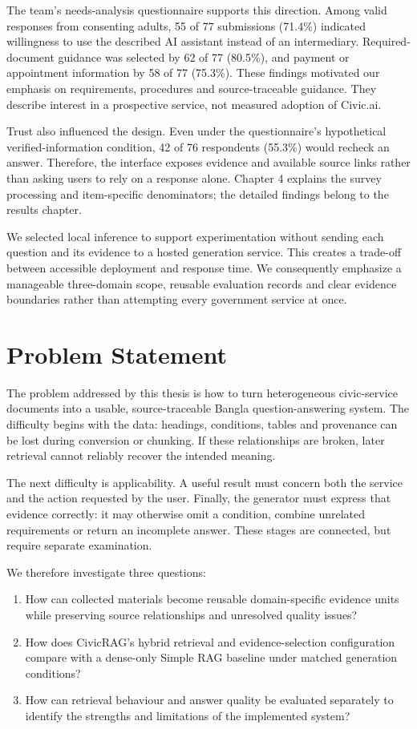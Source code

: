 The team's needs-analysis questionnaire supports this direction. Among valid responses from consenting adults, 55 of 77 submissions (71.4\%) indicated willingness to use the described AI assistant instead of an intermediary. Required-document guidance was selected by 62 of 77 (80.5\%), and payment or appointment information by 58 of 77 (75.3\%). These findings motivated our emphasis on requirements, procedures and source-traceable guidance. They describe interest in a prospective service, not measured adoption of Civic.ai.

Trust also influenced the design. Even under the questionnaire's hypothetical verified-information condition, 42 of 76 respondents (55.3\%) would recheck an answer. Therefore, the interface exposes evidence and available source links rather than asking users to rely on a response alone. Chapter 4 explains the survey processing and item-specific denominators; the detailed findings belong to the results chapter.

We selected local inference to support experimentation without sending each question and its evidence to a hosted generation service. This creates a trade-off between accessible deployment and response time. We consequently emphasize a manageable three-domain scope, reusable evaluation records and clear evidence boundaries rather than attempting every government service at once.

\section{Problem Statement}
The problem addressed by this thesis is how to turn heterogeneous civic-service documents into a usable, source-traceable Bangla question-answering system. The difficulty begins with the data: headings, conditions, tables and provenance can be lost during conversion or chunking. If these relationships are broken, later retrieval cannot reliably recover the intended meaning.

The next difficulty is applicability. A useful result must concern both the service and the action requested by the user. Finally, the generator must express that evidence correctly: it may otherwise omit a condition, combine unrelated requirements or return an incomplete answer. These stages are connected, but require separate examination.

We therefore investigate three questions:
\begin{enumerate}
\item How can collected materials become reusable domain-specific evidence units while preserving source relationships and unresolved quality issues?
\item How does CivicRAG's hybrid retrieval and evidence-selection configuration compare with a dense-only Simple RAG baseline under matched generation conditions?
\item How can retrieval behaviour and answer quality be evaluated separately to identify the strengths and limitations of the implemented system?
\end{enumerate}

